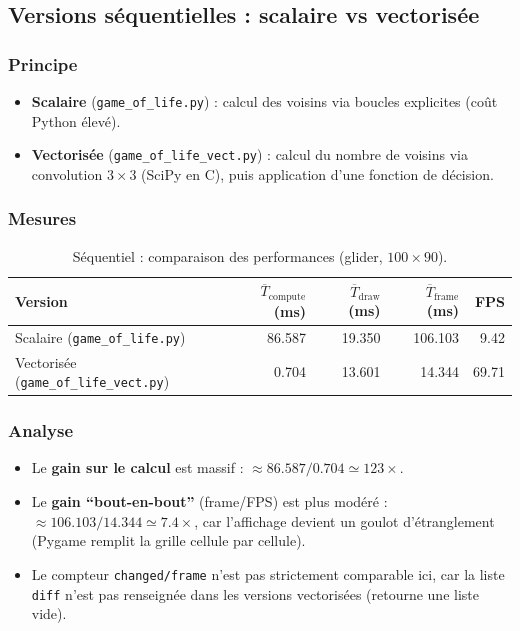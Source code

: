 \documentclass[11pt,a4paper]{article}
\begin{document}
\subsection{Versions séquentielles : scalaire vs vectorisée}

\subsubsection{Principe}

\begin{itemize}[leftmargin=1.2em]
  \item \textbf{Scalaire} (\texttt{game\_of\_life.py}) : calcul des voisins via boucles explicites (coût Python élevé).
  \item \textbf{Vectorisée} (\texttt{game\_of\_life\_vect.py}) : calcul du nombre de voisins via convolution $3\times 3$ (SciPy en C), puis application d’une fonction de décision.
\end{itemize}

\subsubsection{Mesures}

\begin{table}[H]
  \centering
  \small
  \caption{Séquentiel : comparaison des performances (glider, $100 \times 90$).}
  \label{tab:seq-compare}
  \begin{tabular}{@{}lrrrr@{}}
    \toprule
    Version & $\overline{T}_{\text{compute}}$ (ms) & $\overline{T}_{\text{draw}}$ (ms) & $\overline{T}_{\text{frame}}$ (ms) & FPS \\
    \midrule
    Scalaire (\texttt{game\_of\_life.py}) & 86.587 & 19.350 & 106.103 & 9.42 \\
    Vectorisée (\texttt{game\_of\_life\_vect.py}) & 0.704 & 13.601 & 14.344 & 69.71 \\
    \bottomrule
  \end{tabular}
\end{table}

\subsubsection{Analyse}

\begin{itemize}[leftmargin=1.2em]
  \item Le \textbf{gain sur le calcul} est massif : $\approx 86.587/0.704 \simeq 123\times$.
  \item Le \textbf{gain ``bout-en-bout''} (frame/FPS) est plus modéré : $\approx 106.103/14.344 \simeq 7.4\times$,
        car l’affichage devient un goulot d’étranglement (Pygame remplit la grille cellule par cellule).
  \item Le compteur \texttt{changed/frame} n’est pas strictement comparable ici, car la liste \texttt{diff} n’est pas renseignée dans les versions vectorisées (retourne une liste vide).
\end{itemize}
\end{document}

